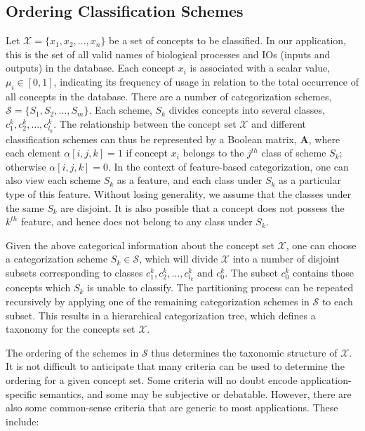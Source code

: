 \subsection{Ordering Classification Schemes}
\label{sec:Algorithm}

Let $\mathcal{X} = \{ x_{1}, x_{2}, \ldots, x_{n} \}$ be a set of concepts to be classified.
In our application, this is the set of all valid names of biological processes and IOs (inputs and outputs) in the database.
Each concept $x_i$ is associated with a scalar value, $\mu_i \in [0, 1]$, indicating its frequency of usage in relation to the total occurrence of all concepts in the database.
There are a number of categorization schemes, $\mathcal{S} = \{ S_1, S_2, \ldots, S_m \}$.
Each scheme, $S_k$ divides concepts into several classes, $c^k_1, c^k_2, \ldots, c^k_{l_k}$.
The relationship between the concept set $\mathcal{X}$ and different classification schemes can thus be represented by a Boolean matrix, $\mathbf{A}$, where each element $\alpha[i,j,k] = 1$ if concept $x_i$ belongs to the $j^{th}$ class of scheme $S_k$; otherwise $\alpha[i,j,k] = 0$.
In the context of feature-based categorization, one can also view each scheme $S_k$ as a feature, and each class under $S_k$ as a particular type of this feature.
Without losing generality, we assume that the classes under the same $S_k$ are disjoint.
It is also possible that a concept does not possess the $k^{th}$ feature, and hence does not belong to any class under $S_k$.

Given the above categorical information about the concept set $\mathcal{X}$, one can choose a categorization scheme $S_k \in \mathcal{S}$, which will divide $\mathcal{X}$ into a number of disjoint subsets corresponding to classes $c^k_1, c^k_2, \ldots, c^k_{l_k}$ and $c^k_0$.
The subset $c^k_0$ contains those concepts which $S_k$ is unable to classify.
The partitioning process can be repeated recursively by applying one of the remaining categorization schemes in $\mathcal{S}$ to each subset.
This results in a hierarchical categorization tree, which defines a taxonomy for the concepts set $\mathcal{X}$.

The ordering of the schemes in $\mathcal{S}$ thus determines the taxonomic structure of $\mathcal{X}$.
It is not difficult to anticipate that many criteria can be used to determine the ordering for a given concept set.
Some criteria will no doubt encode application-specific semantics, and some may be subjective or debatable.
However, there are also some common-sense criteria that are generic to most applications.
These include:


